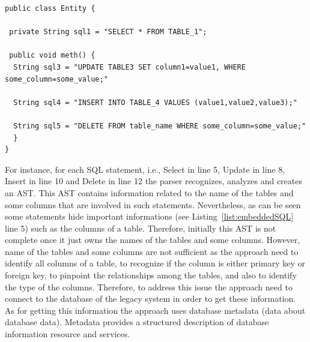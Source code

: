 \documentclass[a4paper,twoside]{article}
\begin{document}
\begin{lstlisting}[caption=Example of Embedded SQL, label=list:embeddedSQL, frame=lrtb, basicstyle=\tiny]
public class Entity {

 private String sql1 = "SELECT * FROM TABLE_1";

 public void meth() {
  String sql3 = "UPDATE TABLE3 SET column1=value1, WHERE some_column=some_value;"
  
  String sql4 = "INSERT INTO TABLE_4 VALUES (value1,value2,value3);"
  
  String sql5 = "DELETE FROM table_name WHERE some_column=some_value;"
  }
}
\end{lstlisting}





For instance, for each SQL statement, i.e., Select in line 5, Update in line 8, Insert in line 10 and Delete in line 12 the parser recognizes, analyzes and creates an AST. This AST contains information related to the name of the tables and some columns that are involved in such statements. Nevertheless, as can be seen some statements hide important informations (see Listing~\ref{list:embeddedSQL} line 5) such as the columns of a table. Therefore, initially this AST is not complete once it just owns the names of the tables and some columns. However, name of the tables and some columns are not sufficient as the approach need to identify all columns of a table, to recognize if the column is either primary key or foreign key, to pinpoint the relationships among the tables, and also to identify the type of the columns. Therefore, to address this issue the approach need to connect to the database of the legacy system in order to get these information.  As for getting this information the approach uses database metadata (data about database data). Metadata provides a structured description of database information resource and services.







\end{document}
